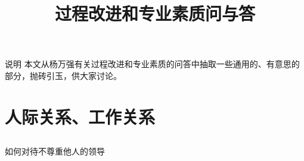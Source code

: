 ﻿\documentclass[hyperref={bookmarks=true},xcolor=pdflatex,svgnames,table,compress]{beamer}
\title{过程改进和专业素质问与答}
\author{}
\date{}
\begin{document}
\begin{frame}
  \titlepage
\end{frame}

\subsection{}
\begin{frame}{说明}
  本文从杨万强有关过程改进和专业素质的问答中抽取一些通用的、有意思的部分，抛砖引玉，供大家讨论。
\end{frame}

\section{人际关系、工作关系}

\subsection{}
\begin{frame}{如何对待不尊重他人的领导}

\end{frame}
\end{document}
